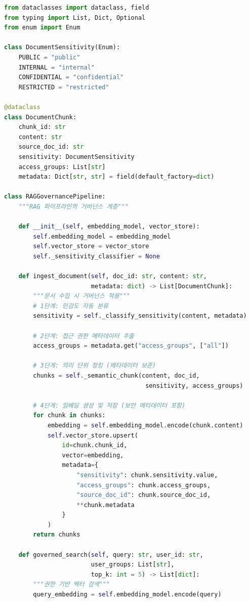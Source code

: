 \begin{lstlisting}[language=Python, caption={RAG 거버넌스 파이프라인 구현}, label={lst:rag_governance_pipeline}]
from dataclasses import dataclass, field
from typing import List, Dict, Optional
from enum import Enum

class DocumentSensitivity(Enum):
    PUBLIC = "public"
    INTERNAL = "internal"
    CONFIDENTIAL = "confidential"
    RESTRICTED = "restricted"

@dataclass
class DocumentChunk:
    chunk_id: str
    content: str
    source_doc_id: str
    sensitivity: DocumentSensitivity
    access_groups: List[str]
    metadata: Dict[str, str] = field(default_factory=dict)

class RAGGovernancePipeline:
    """RAG 파이프라인의 거버넌스 계층"""

    def __init__(self, embedding_model, vector_store):
        self.embedding_model = embedding_model
        self.vector_store = vector_store
        self._sensitivity_classifier = None

    def ingest_document(self, doc_id: str, content: str,
                        metadata: dict) -> List[DocumentChunk]:
        """문서 수집 시 거버넌스 적용"""
        # 1단계: 민감도 자동 분류
        sensitivity = self._classify_sensitivity(content, metadata)

        # 2단계: 접근 권한 메타데이터 추출
        access_groups = metadata.get("access_groups", ["all"])

        # 3단계: 의미 단위 청킹 (메타데이터 보존)
        chunks = self._semantic_chunk(content, doc_id,
                                       sensitivity, access_groups)

        # 4단계: 임베딩 생성 및 저장 (보안 메타데이터 포함)
        for chunk in chunks:
            embedding = self.embedding_model.encode(chunk.content)
            self.vector_store.upsert(
                id=chunk.chunk_id,
                vector=embedding,
                metadata={
                    "sensitivity": chunk.sensitivity.value,
                    "access_groups": chunk.access_groups,
                    "source_doc_id": chunk.source_doc_id,
                    **chunk.metadata
                }
            )
        return chunks

    def governed_search(self, query: str, user_id: str,
                        user_groups: List[str],
                        top_k: int = 5) -> List[dict]:
        """권한 기반 벡터 검색"""
        query_embedding = self.embedding_model.encode(query)


\end{lstlisting}
